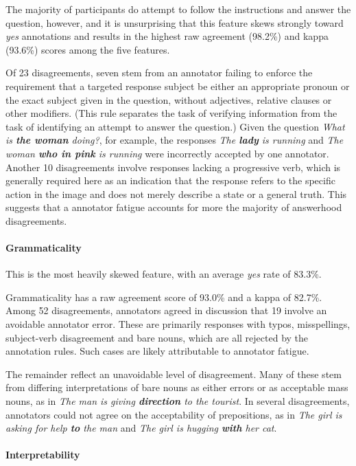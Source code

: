 \documentclass[11pt,a4paper]{article}
\begin{document}
The majority of participants do attempt to follow the instructions and answer the question, however, and it is unsurprising that this feature skews strongly toward \textit{yes} annotations and results in the highest raw agreement (98.2\%) and kappa (93.6\%) scores among the five features.

Of 23 disagreements, seven stem from an annotator failing to enforce the requirement that a targeted response subject be either an appropriate pronoun or the exact subject given in the question, without adjectives, relative clauses or other modifiers. (This rule separates the task of verifying information from the task of identifying an attempt to answer the question.) Given the question \textit{What is \textbf{the woman} doing?}, for example, the responses \textit{The \textbf{lady} is running} and \textit{The woman \textbf{who in pink} is running} were incorrectly accepted by one annotator. Another 10 disagreements involve responses lacking a progressive verb, which is generally required here as an indication that the response refers to the specific action in the image and does not merely describe a state or a general truth. This suggests that a annotator fatigue accounts for more the majority of answerhood disagreements.

\paragraph{Grammaticality} This is the most heavily skewed feature, with an average \textit{yes} rate of 83.3\%.

Grammaticality has a raw agreement score of 93.0\% and a kappa of 82.7\%. Among 52 disagreements, annotators agreed in discussion that 19 involve an avoidable annotator error. These are primarily responses with typos, misspellings, subject-verb disagreement and bare nouns, which are all rejected by the annotation rules. Such cases are likely attributable to annotator fatigue.

The remainder reflect an unavoidable level of disagreement. Many of these stem from differing interpretations of bare nouns as either errors or as acceptable mass nouns, as in \textit{The man is giving \textbf{direction} to the tourist}. In several disagreements, annotators could not agree on the acceptability of prepositions, as in \textit{The girl is asking for help \textbf{to} the man} and \textit{The girl is hugging \textbf{with} her cat}.


\paragraph{Interpretability}
\end{document}
